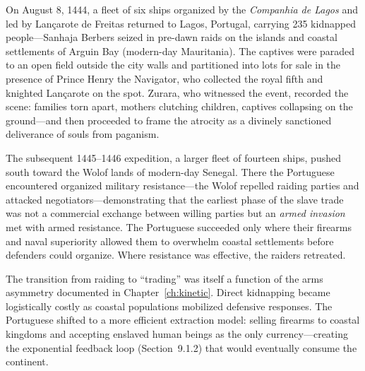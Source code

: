 On August 8, 1444, a fleet of six ships organized by the \textit{Companhia de Lagos} and led by Lançarote de Freitas returned to Lagos, Portugal, carrying 235 kidnapped people---Sanhaja Berbers seized in pre-dawn raids on the islands and coastal settlements of Arguin Bay (modern-day Mauritania). The captives were paraded to an open field outside the city walls and partitioned into lots for sale in the presence of Prince Henry the Navigator, who collected the royal fifth and knighted Lançarote on the spot. Zurara, who witnessed the event, recorded the scene: families torn apart, mothers clutching children, captives collapsing on the ground---and then proceeded to frame the atrocity as a divinely sanctioned deliverance of souls from paganism.

The subsequent 1445--1446 expedition, a larger fleet of fourteen ships, pushed south toward the Wolof lands of modern-day Senegal. There the Portuguese encountered organized military resistance---the Wolof repelled raiding parties and attacked negotiators---demonstrating that the earliest phase of the slave trade was not a commercial exchange between willing parties but an \textit{armed invasion} met with armed resistance. The Portuguese succeeded only where their firearms and naval superiority allowed them to overwhelm coastal settlements before defenders could organize. Where resistance was effective, the raiders retreated.

The transition from raiding to ``trading'' was itself a function of the arms asymmetry documented in Chapter~\ref{ch:kinetic}. Direct kidnapping became logistically costly as coastal populations mobilized defensive responses. The Portuguese shifted to a more efficient extraction model: selling firearms to coastal kingdoms and accepting enslaved human beings as the only currency---creating the exponential feedback loop (Section~9.1.2) that would eventually consume the continent.

